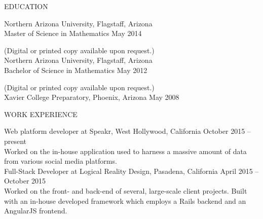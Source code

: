 \documentclass[10pt]{article}
\begin{document}
\vspace{2em}
\noindent \textsf{EDUCATION}
\vspace{8pt}


\noindent Northern Arizona University, Flagstaff, Arizona \\
\indent Master of Science in Mathematics %
	\hfill May 2014 \\

\hfill{\footnotesize (Digital or printed copy available upon request.)} \\

\noindent Northern Arizona University, Flagstaff, Arizona \\
\indent Bachelor of Science in Mathematics %
	\hfill May 2012 \\

\hfill{\footnotesize (Digital or printed copy available upon request.)} \\

\noindent Xavier College Preparatory, Phoenix, Arizona \hfill May 2008

\vspace{2em}
\noindent \textsf{WORK EXPERIENCE}
\vspace{8pt}

\noindent Web platform developer at Speakr, West Hollywood, California \hfill October 2015 -- present \\
\indent Worked on the in-house application used to harness a massive amount of data from various social media platforms.\\

\noindent Full-Stack Developer at Logical Reality Design, Pasadena, California \hfill April 2015 -- October 2015 \\
\indent Worked on the front- and back-end of several, large-scale client projects. Built with an in-house developed framework which employs a Rails backend and an AngularJS frontend.\\
\end{document}
